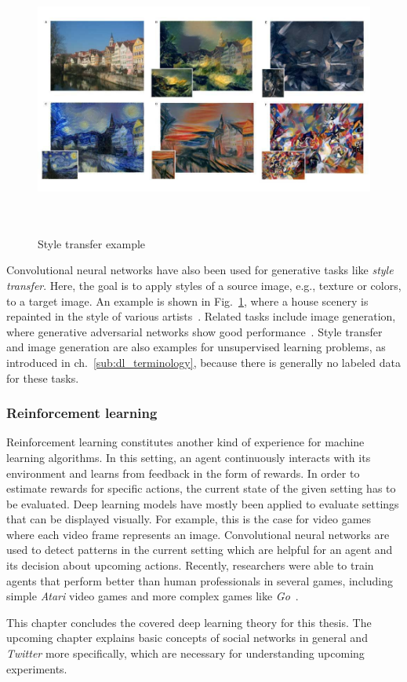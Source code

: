 \begin{figure}[h]
  \centering
  \includegraphics[height=9cm]{img/style_transfer.jpg}
  \caption[Style transfer example]{Style transfer example~\cite{Gatys2015}}
\label{fig:style_transfer}
\end{figure}

Convolutional neural networks have also been used for generative tasks like
\textit{style transfer}.
Here, the goal is to apply styles of a source image, e.g., texture or colors,
to a target image.
An example is shown in Fig.~\ref{fig:style_transfer}, where a house scenery is
repainted in the style of various artists~\cite{Gatys2015}.
Related tasks include image generation, where generative adversarial networks
show good performance~\cite{Radford2015}.
Style transfer and image generation are also examples for unsupervised learning
problems, as introduced in ch.~\ref{sub:dl_terminology}, because there is
generally no labeled data for these tasks.

\subsubsection{Reinforcement learning}
\label{sub:dl_app_rl}

Reinforcement learning constitutes another kind of experience for machine
learning algorithms.
In this setting, an agent continuously interacts with its environment and learns
from feedback in the form of rewards.
In order to estimate rewards for specific actions, the current state of the
given setting has to be evaluated.
Deep learning models have mostly been applied to evaluate settings that can
be displayed visually.
For example, this is the case for video games where each video frame represents an image.
Convolutional neural networks are used to detect patterns in the current
setting which are helpful for an agent and its decision about upcoming
actions.
Recently, researchers were able to train agents that perform better than human
professionals in several games, including simple \textit{Atari} video games
and more complex games like \textit{Go}~\cite{Mnih2015, Silver2016}.

This chapter concludes the covered deep learning theory for this thesis.
The upcoming chapter explains basic concepts of social networks in general and
\textit{Twitter} more specifically, which are necessary for understanding
upcoming experiments.

